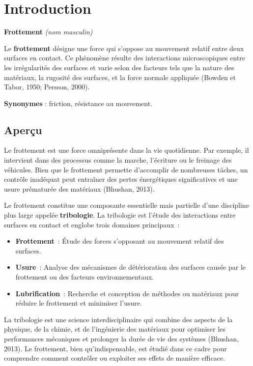 \chapter*{Introduction}

\textbf{Frottement} \textit{(nom masculin)}

Le \textbf{frottement} désigne une force qui s'oppose au mouvement relatif entre deux surfaces en contact. Ce phénomène résulte des interactions microscopiques entre les irrégularités des surfaces et varie selon des facteurs tels que la nature des matériaux, la rugosité des surfaces, et la force normale appliquée (Bowden et Tabor, 1950; Persson, 2000).

\textbf{Synonymes} : friction, résistance au mouvement.

\section*{Aperçu}

Le frottement est une force omniprésente dans la vie quotidienne. Par exemple, il intervient dans des processus comme la marche, l'écriture ou le freinage des véhicules. Bien que le frottement permette d'accomplir de nombreuses tâches, un contrôle inadéquat peut entraîner des pertes énergétiques significatives et une usure prématurée des matériaux (Bhushan, 2013).

Le frottement constitue une composante essentielle mais partielle d’une discipline plus large appelée \textbf{tribologie}. La tribologie est l’étude des interactions entre surfaces en contact et englobe trois domaines principaux :
\begin{itemize}
    \item \textbf{Frottement} : Étude des forces s’opposant au mouvement relatif des surfaces.
    \item \textbf{Usure} : Analyse des mécanismes de détérioration des surfaces causée par le frottement ou des facteurs environnementaux.
    \item \textbf{Lubrification} : Recherche et conception de méthodes ou matériaux pour réduire le frottement et minimiser l’usure.
\end{itemize}

La tribologie est une science interdisciplinaire qui combine des aspects de la physique, de la chimie, et de l’ingénierie des matériaux pour optimiser les performances mécaniques et prolonger la durée de vie des systèmes (Bhushan, 2013). Le frottement, bien qu’indispensable, est étudié dans ce cadre pour comprendre comment contrôler ou exploiter ses effets de manière efficace.

